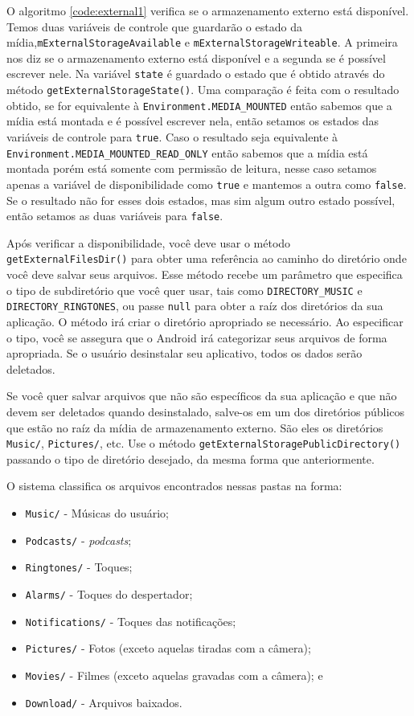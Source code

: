 \documentclass[a4paper,12pt,brazil]{book}
\begin{document}
\begin{singlespace}
		O algoritmo \ref{code:external1} verifica se o armazenamento externo está disponível. Temos duas variáveis de controle que guardarão o estado da mídia,\texttt{mExternalStorageAvailable} e \texttt{mExternalStorageWriteable}. A primeira nos diz se o armazenamento externo está disponível e a segunda se é possível escrever nele. Na variável \texttt{state} é guardado o estado que é obtido através do método \texttt{getExternalStorageState()}. Uma comparação é feita com o resultado obtido, se for equivalente à \texttt{Environment.MEDIA\_MOUNTED} então sabemos que a mídia está montada e é possível escrever nela, então setamos os estados das variáveis de controle para \texttt{true}. Caso o resultado seja equivalente à \texttt{Environment.MEDIA\_MOUNTED\_READ\_ONLY} então sabemos que a mídia está montada porém está somente com permissão de leitura, nesse caso setamos apenas a variável de disponibilidade como \texttt{true} e mantemos a outra como \texttt{false}. Se o resultado não for esses dois estados, mas sim algum outro estado possível, então setamos as duas variáveis para \texttt{false}.

		Após verificar a disponibilidade, você deve usar o método \texttt{getExternalFilesDir()} para obter uma referência ao caminho do diretório onde você deve salvar seus arquivos. Esse método recebe um parâmetro que especifica o tipo de subdiretório que você quer usar, tais como \texttt{DIRECTORY\_MUSIC} e \texttt{DIRECTORY\_RINGTONES}, ou passe \texttt{null} para obter a raíz dos diretórios da sua aplicação. O método irá criar o diretório apropriado se necessário. Ao especificar o tipo, você se assegura que o Android irá categorizar seus arquivos de forma apropriada. Se o usuário desinstalar seu aplicativo, todos os dados serão deletados.

		Se você quer salvar arquivos que não são específicos da sua aplicação e que não devem ser deletados quando desinstalado, salve-os em um dos diretórios públicos que estão no raíz da mídia de armazenamento externo. São eles os diretórios \texttt{Music/}, \texttt{Pictures/}, etc. Use o método \texttt{getExternalStoragePublicDirectory()} passando o tipo de diretório desejado, da mesma forma que anteriormente.

		O sistema classifica os arquivos encontrados nessas pastas na forma:

		\begin{itemize}[noitemsep]
			\item \texttt{Music/} - Músicas do usuário;
			\item \texttt{Podcasts/} - \emph{podcasts};
			\item \texttt{Ringtones/} - Toques;
			\item \texttt{Alarms/} - Toques do despertador;
			\item \texttt{Notifications/} - Toques das notificações;
			\item \texttt{Pictures/} - Fotos (exceto aquelas tiradas com a câmera);
			\item \texttt{Movies/} - Filmes (exceto aquelas gravadas com a câmera); e
			\item \texttt{Download/} - Arquivos baixados.
		\end{itemize}


\end{singlespace}
\end{document}
